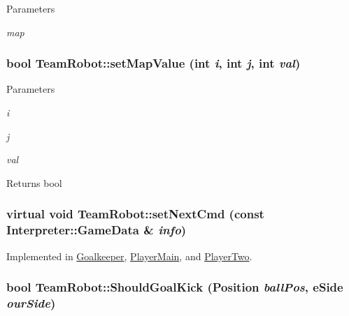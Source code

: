 \begin{DoxyParams}{Parameters}
\item[{\em map}]\end{DoxyParams}
\hypertarget{classTeamRobot_a28ee2460e7d465989bb0582782db851e}{
\subsubsection[{setMapValue}]{\setlength{\rightskip}{0pt plus 5cm}bool TeamRobot::setMapValue (int {\em i}, \/  int {\em j}, \/  int {\em val})}}
\label{classTeamRobot_a28ee2460e7d465989bb0582782db851e}

\begin{DoxyParams}{Parameters}
\item[{\em i}]\item[{\em j}]\item[{\em val}]\end{DoxyParams}
\begin{DoxyReturn}{Returns}
bool 
\end{DoxyReturn}
\hypertarget{classTeamRobot_a65f9a2b7464dfac3f4a0336810cf574f}{
\subsubsection[{setNextCmd}]{\setlength{\rightskip}{0pt plus 5cm}virtual void TeamRobot::setNextCmd (const {\bf Interpreter::GameData} \& {\em info})}}
\label{classTeamRobot_a65f9a2b7464dfac3f4a0336810cf574f}


Implemented in \hyperlink{classGoalkeeper_abc394351f7c0d552c6e96da422c772ec}{Goalkeeper}, \hyperlink{classPlayerMain_a8f0320189df15529662c7f16d2f74084}{PlayerMain}, and \hyperlink{classPlayerTwo_a7ac9a9a4f1dedee2006e6a0c79f37c0c}{PlayerTwo}.

\hypertarget{classTeamRobot_ae7f6fa303c865dad297b662731165883}{
\subsubsection[{ShouldGoalKick}]{\setlength{\rightskip}{0pt plus 5cm}bool TeamRobot::ShouldGoalKick (Position {\em ballPos}, \/  eSide {\em ourSide})}}
\label{classTeamRobot_ae7f6fa303c865dad297b662731165883}

